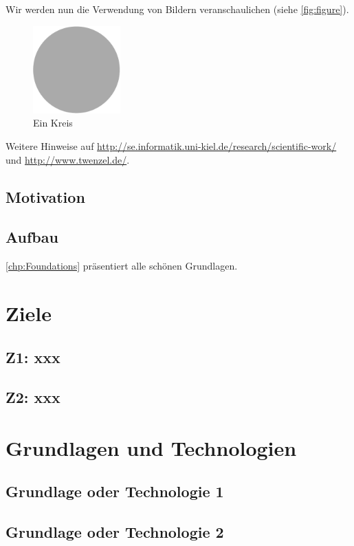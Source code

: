   Wir werden nun die Verwendung von Bildern veranschaulichen (siehe \autoref{fig:figure}).
  
  \begin{figure}[t]%
    \centering%
    \includegraphics[width=0.3\textwidth]{img/template_circle.pdf}%
    \caption{Ein Kreis}%
    \label{fig:figure}%
  \end{figure}%

  Weitere Hinweise auf \url{http://se.informatik.uni-kiel.de/research/scientific-work/} und \url{http://www.twenzel.de/}.

  \section{Motivation}
    \blindtext
  \section{Aufbau}
    \autoref{chp:Foundations} präsentiert alle schönen Grundlagen. 

\chapter{Ziele}\label{chp:Goals}
  \section{Z1: xxx}
    \blindtext
  \section{Z2: xxx}
    \blindtext

\chapter{Grundlagen und Technologien}\label{chp:Foundations}
  \section{Grundlage oder Technologie 1}
    \blindtext
  \section{Grundlage oder Technologie 2}
    \blindtext
